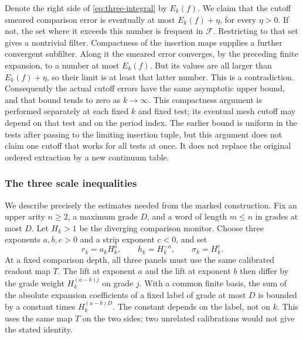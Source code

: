 Denote the right side of \eqref{eq:three-integral} by $E_k(f)$. We claim
that the cutoff smeared comparison error is eventually at most
$E_k(f)+\eta$, for every $\eta>0$. If not, the set where it exceeds this
number is frequent in $\mathcal F$. Restricting to that set gives a
nontrivial filter. Compactness of the insertion maps supplies a further
convergent subfilter. Along it the smeared error converges, by the preceding
finite expansion, to a number at most $E_k(f)$. But its values are all
larger than $E_k(f)+\eta$, so their limit is at least that latter number.
This is a contradiction. Consequently the actual cutoff errors have the
same asymptotic upper bound, and that bound tends to zero as $k\to\infty$.
This compactness argument is performed separately at each fixed $k$ and
fixed test; its eventual mesh cutoff may depend on that test and on the
period index. The earlier bound is uniform in the tests after passing to the
limiting insertion tuple, but
this argument does not claim one cutoff that works for all tests at once.
It does not replace the original ordered extraction by a new continuum table.

\subsubsection{The three scale inequalities}

We describe precisely the estimates needed from the marked construction.
Fix an upper arity $n\ge2$, a maximum grade $D$, and a word of length
$m\le n$ in grades at most $D$. Let $H_k>1$ be the diverging comparison
monitor. Choose three exponents $a,b,e>0$ and a strip exponent $c<0$,
and set
\[
 r_k=a_kH_k^a,\qquad h_k=H_k^{-a},\qquad
 \sigma_k=H_k^c.
\]
At a fixed comparison depth, all three panels must use the same calibrated
readout map $T$. The lift at exponent $a$ and the lift at exponent $b$
then differ by the grade weight $H_k^{(a-b)j}$ on grade $j$.
With a common finite basis, the sum of the absolute expansion coefficients
of a fixed label of grade at most $D$ is bounded by a constant times
$H_k^{(a-b)D}$. The constant depends on the label, not on $k$.
This uses the same map $T$ on the two sides; two unrelated calibrations
would not give the stated identity.

